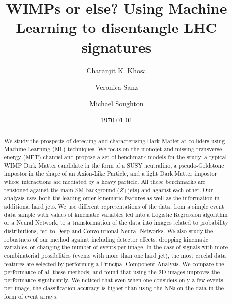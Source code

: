 \documentclass[prd,aps,letterpaper,floatfix,superscriptaddress,preprintnumbers,twocolumn,10pt,nofootinbib]{revtex4-1}
\begin{document}
\title{WIMPs or else? Using Machine Learning to disentangle LHC signatures}
\author{Charanjit K. Khosa} 

\author{Veronica Sanz} 
\author{Michael Soughton} 



\date{\today}
\begin{abstract}
We study the prospects of detecting and characterising Dark Matter at colliders using Machine Learning (ML) techniques. We focus on the  monojet and missing transverse energy (MET) channel and propose a set of benchmark models for the study: a typical WIMP Dark Matter candidate in the form of a SUSY neutralino, a pseudo-Goldstone impostor in the shape of an Axion-Like Particle, and a light Dark Matter impostor whose interactions are mediated by a heavy particle. All these benchmarks are tensioned against the main SM background ($Z$+jets) and against each other. Our analysis uses both the leading-order kinematic features as well as the information in additional hard jets. We use different representations of the data, from a simple event data sample with values of kinematic variables fed into a Logistic Regression algorithm or a Neural Network, to a transformation of the data into images related to probability distributions, fed to Deep and Convolutional Neural Networks. We also study the robustness of our method against including detector effects, dropping kinematic variables, or changing the number of events per image. In the case of signals with more combinatorial possibilities (events with more than one hard jet), the most crucial data features are selected by performing a Principal Component Analysis. We compare the performance of all these methods, and found that using the 2D images improves the performance significantly. We noticed that even when one considers only a few events per image, the classification accuracy is higher than using the NNs on the data in the form of event arrays. 
\end{abstract}
\maketitle 
\end{document}
